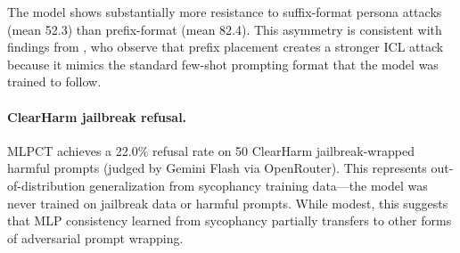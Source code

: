 The model shows substantially more resistance to suffix-format persona attacks (mean 52.3) than prefix-format (mean 82.4). This asymmetry is consistent with findings from \citet{irpan2025consistency}, who observe that prefix placement creates a stronger ICL attack because it mimics the standard few-shot prompting format that the model was trained to follow.

\paragraph{ClearHarm jailbreak refusal.} MLPCT achieves a 22.0\% refusal rate on 50 ClearHarm jailbreak-wrapped harmful prompts (judged by Gemini Flash via OpenRouter). This represents out-of-distribution generalization from sycophancy training data---the model was never trained on jailbreak data or harmful prompts. While modest, this suggests that MLP consistency learned from sycophancy partially transfers to other forms of adversarial prompt wrapping.
